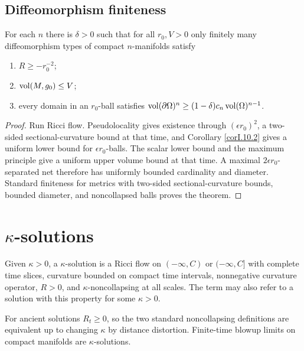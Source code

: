 \subsection{Diffeomorphism finiteness}
\label{I.10.5}
\begin{theorem}
  \label{thm:kl-diffeomorphism-finiteness-existence-riemannian-metrics}
For each $n$ there is $\delta>0$ such that for all $r_0,V>0$ only finitely many
diffeomorphism types of compact $n$-manifolds satisfy
\begin{enumerate}
\item $R\ge-r_0^{-2}$;
\item $\operatorname{vol}(M,g_0)\le V$;
\item every domain in an $r_0$-ball satisfies
$\operatorname{vol}(\partial\Omega)^n\ge(1-\delta)c_n\operatorname{vol}(\Omega)^{n-1}$.
\end{enumerate}
\end{theorem}
\begin{proof}
\sketch
Run Ricci flow. Pseudolocality gives existence through $(\epsilon r_0)^2$, a
two-sided sectional-curvature bound at that time, and Corollary \ref{corI.10.2}
gives a uniform lower bound for $\epsilon r_0$-balls. The scalar lower bound and
the maximum principle give a uniform upper volume bound at that time. A maximal
$2\epsilon r_0$-separated net therefore has uniformly bounded cardinality and
diameter. Standard finiteness for metrics with two-sided sectional-curvature
bounds, bounded diameter, and noncollapsed balls proves the theorem.
\end{proof}

\section{$\kappa$-solutions}
\label{secI.11.1}
\begin{definition}
\label{def:kl-solutions-kappa-noncollapsing}

Given $\kappa>0$, a $\kappa$-solution is a Ricci flow on
 $(-\infty,C)$ or $(-\infty,C]$ with complete time slices, curvature
bounded on compact time intervals, nonnegative curvature operator, $R>0$,
and $\kappa$-noncollapsing at all scales.  The term may also refer to a
solution with this property for some $\kappa>0$.
\end{definition}
For ancient solutions $R_t\geq0$, so the two standard noncollapsing
definitions are equivalent up to changing $\kappa$ by distance distortion.
Finite-time blowup limits on compact manifolds are $\kappa$-solutions.

